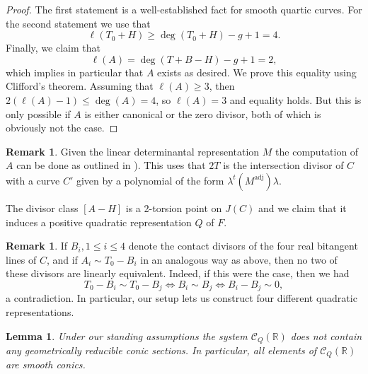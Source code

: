 \documentclass[a4paper,10pt]{amsart}
\theoremstyle{definition}
\newtheorem{rem}[Def]{Remark}
\theoremstyle{plain}
\newtheorem{lem}[Def]{Lemma}
\newcommand{\adj}{\operatorname{adj}} %
\newcommand{\cC}{{\mathcal C}}
\newcommand{\R}{{\mathbb R}}
\begin{document}
\begin{proof}
    The first statement is a well-established fact for smooth quartic curves. For the second statement we use that
    \begin{equation*}
        \ell(T_0 + H) \geq \deg(T_0 + H) - g + 1 = 4.
    \end{equation*}
    Finally, we claim that
    \begin{equation*}
        \ell(A) = \deg(T + B - H) - g + 1 = 2,
    \end{equation*}
    which implies in particular that $A$ exists as desired. We prove this equality using Clifford's theorem. Assuming that $\ell(A) \geq 3$, then $2(\ell(A) - 1) \leq \deg(A) = 4$, so $\ell(A) = 3$ and equality holds. But this is only possible if $A$ is either canonical or the zero divisor, both of which is obviously not the case.
\end{proof}

\begin{rem}
    Given the linear determinantal representation $M$ the computation of $A$ can be done as outlined in  \cite[Lemma 6.7]{plaumann}). This uses that $2T$ is the intersection divisor of $C$ with a curve $C'$ given by a polynomial of the form $\lambda^t (M^{\adj}) \lambda$.
\end{rem}

The divisor class $[A - H]$ is a 2-torsion point on $J(C)$ and we claim that it induces a positive quadratic representation $Q$ of $F$.

\begin{rem}
    If $B_i, 1 \leq i \leq 4$ denote the contact divisors of the four real bitangent lines of $C$, and if $A_i \sim T_0 - B_i$ in an analogous way as above, then no two of these divisors are linearly equivalent. Indeed, if this were the case, then we had
    \begin{equation*}
        T_0 - B_i \sim T_0 - B_j \iff B_i \sim B_j \iff B_i - B_j \sim 0,
    \end{equation*}
    a contradiction. In particular, our setup lets us construct four different quadratic representations.
\end{rem}


\begin{lem} \label{lem:geomirr}
    Under our standing assumptions the system $\cC_Q(\R)$ does not contain any geometrically reducible conic sections. In particular, all elements of $\cC_Q(\R)$ are smooth conics.
\end{lem}
\end{document}
